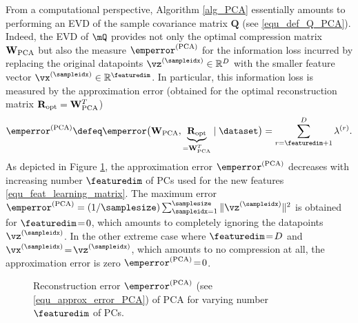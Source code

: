 \documentclass[12pt]{report}
\begin{document}
From a computational perspective, Algorithm \ref{alg_PCA} essentially amounts to performing an EVD of the sample covariance 
matrix $\mathbf{Q}$ (see \eqref{equ_def_Q_PCA}). Indeed, the EVD of $\mQ$ provides not only the optimal compression matrix 
$\mathbf{W}_{\rm PCA}$ but also the measure $\emperror^{(\rm PCA)}$ for the information loss incurred by replacing the original 
datapoints $\vz^{(\sampleidx)} \in \mathbb{R}^{D}$ with the smaller feature vector $\vx^{(\sampleidx)} \in \mathbb{R}^{\featuredim}$. 
In particular, this information loss is measured by the approximation error (obtained for the optimal reconstruction matrix 
$\mathbf{R}_{\rm opt} = \mathbf{W}_{\rm PCA}^{T}$)
\begin{equation} 
\label{equ_approx_error_PCA}
\emperror^{(\rm PCA)} \defeq \emperror \big( \mathbf{W}_{\rm PCA},\underbrace{\mathbf{R}_{\rm opt}}_{=\mathbf{W}_{\rm PCA}^{T}}\mid \dataset\big) = \sum_{r = \featuredim+1}^{D} \lambda^{(r)}. 
\end{equation} 
As depicted in Figure \ref{fig_ellbow_PCA}, the approximation error  $\emperror^{(\rm PCA)}$ decreases with increasing 
number $\featuredim$ of PCs used for the new features \eqref{equ_feat_learning_matrix}. The maximum error 
$\emperror^{(\rm PCA)} = (1/\samplesize) \sum_{\sampleidx=1}^{\samplesize} \| \vz^{(\sampleidx)} \|^{2}$ is obtained for 
$\featuredim\!=\!0$, which amounts to completely ignoring the datapoints $\vz^{(\sampleidx)}$. In the other extreme case 
where $\featuredim\!=\!D$ and $\vx^{(\sampleidx)}\!=\!\vz^{(\sampleidx)}$, which amounts to no compression at all, the 
approximation error is zero $\emperror^{(\rm PCA)}\!=\!0$. 

\begin{figure}[htbp]
\begin{center}
\end{center}
\caption{Reconstruction error $\emperror^{(\rm PCA)}$ (see \eqref{equ_approx_error_PCA}) of PCA for varying number $\featuredim$ of PCs.}
\label{fig_ellbow_PCA}
\end{figure}
\end{document}
